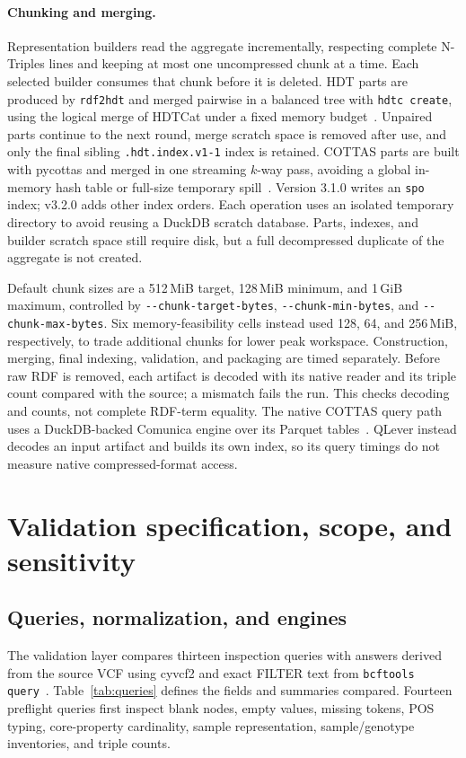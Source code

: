 \documentclass[11pt]{article}
\begin{document}
\paragraph{Chunking and merging.}
Representation builders read the aggregate incrementally, respecting complete N-Triples lines and keeping at most one uncompressed chunk at a time.
Each selected builder consumes that chunk before it is deleted.
HDT parts are produced by \texttt{rdf2hdt} and merged pairwise in a balanced tree with \texttt{hdtc create}, using the logical merge of HDTCat under a fixed memory budget~\cite{hdtcpp,hdt_2013,hdtc_2026,Diefenbach2020HDTCat}.
Unpaired parts continue to the next round, merge scratch space is removed after use, and only the final sibling \texttt{.hdt.index.v1-1} index is retained.
COTTAS parts are built with pycottas and merged in one streaming $k$-way pass, avoiding a global in-memory hash table or full-size temporary spill~\cite{pycottas_2026}.
Version 3.1.0 writes an \texttt{spo} index; v3.2.0 adds other index orders.
Each operation uses an isolated temporary directory to avoid reusing a DuckDB scratch database.
Parts, indexes, and builder scratch space still require disk, but a full decompressed duplicate of the aggregate is not created.

Default chunk sizes are a 512\,MiB target, 128\,MiB minimum, and 1\,GiB maximum, controlled by \texttt{-{}-chunk-target-bytes}, \texttt{-{}-chunk-min-bytes}, and \texttt{-{}-chunk-max-bytes}.
Six memory-feasibility cells instead used 128, 64, and 256\,MiB, respectively, to trade additional chunks for lower peak workspace.
Construction, merging, final indexing, validation, and packaging are timed separately.
Before raw RDF is removed, each artifact is decoded with its native reader and its triple count compared with the source; a mismatch fails the run.
This checks decoding and counts, not complete RDF-term equality.
The native COTTAS query path uses a DuckDB-backed Comunica engine over its Parquet tables~\cite{comunica_cottas_2026}.
QLever instead decodes an input artifact and builds its own index, so its query timings do not measure native compressed-format access.

\section{Validation specification, scope, and sensitivity}\label{sec:validation}
\subsection{Queries, normalization, and engines}\label{subsec:validation-queries}
The validation layer compares thirteen inspection queries with answers derived from the source VCF using cyvcf2 and exact FILTER text from \texttt{bcftools query}~\cite{vcf_intro,BCFtools,cyvcf2_2017}.
Table~\ref{tab:queries} defines the fields and summaries compared.
Fourteen preflight queries first inspect blank nodes, empty values, missing tokens, POS typing, core-property cardinality, sample representation, sample/genotype inventories, and triple counts.
\end{document}

